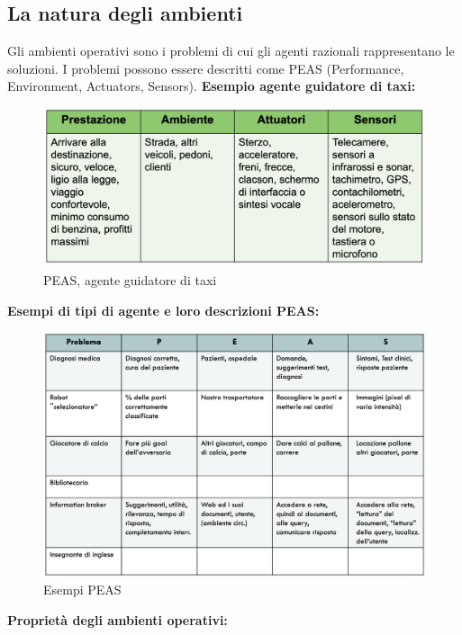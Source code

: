 \documentclass{article}
\begin{document}
\subsection{La natura degli ambienti}
Gli ambienti operativi sono i problemi di cui gli agenti razionali rappresentano le soluzioni. I problemi possono essere descritti come PEAS (Performance, Environment, Actuators, Sensors).\newline
\textbf{Esempio agente guidatore di taxi:}
\begin{figure}[H]
    \centering
    \includegraphics[width=0.5\linewidth]{Images/guidatoreTaxiPEAS.png}
    \caption{PEAS, agente guidatore di taxi}
    \label{fig:enter-label}
\end{figure}
\textbf{Esempi di tipi di agente e loro descrizioni PEAS:}
\begin{figure}[H]
    \centering
    \includegraphics[width=0.5\linewidth]{Images/EsempiPEAS.png}
    \caption{Esempi PEAS}
    \label{fig:enter-label}
\end{figure}
\textbf{Proprietà degli ambienti operativi:}
\end{document}
